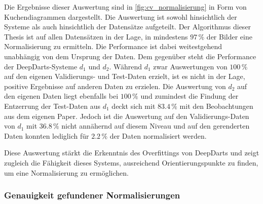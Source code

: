 Die Ergebnisse dieser Auswertung sind in \autoref{fig:cv_normalisierung} in Form von Kuchendiagrammen dargestellt. Die Auswertung ist sowohl hinsichtlich der Systeme als auch hinsichtlich der Datensätze aufgeteilt. Der Algorithmus dieser Thesis ist auf allen Datensätzen in der Lage, in mindestens $97\,\%$ der Bilder eine Normalisierung zu ermitteln. Die Performance ist dabei weitestgehend unabhängig von dem Ursprung der Daten. Dem gegenüber steht die Performance der DeepDarts-Systeme $d_1$ und $d_2$. Während $d_1$ zwar Auswertungen von $100\,\%$ auf den eigenen Validierungs- und Test-Daten erzielt, ist es nicht in der Lage, positive Ergebnisse auf anderen Daten zu erzielen. Die Auswertung von $d_2$ auf den eigenen Daten liegt ebenfalls bei $100\,\%$ und zumindest die Findung der Entzerrung der Test-Daten aus $d_1$ deckt sich mit $83.4\,\%$ mit den Beobachtungen aus dem eigenen Paper. Jedoch ist die Auswertung auf den Validierungs-Daten von $d_1$ mit $36.8\,\%$ nicht annähernd auf diesem Niveau und auf den gerenderten Daten konnten lediglich für $2.2\,\%$ der Daten normalisiert werden.

Diese Auswertung stärkt die Erkenntnis des Overfittings von DeepDarts und zeigt zugleich die Fähigkeit dieses Systems, ausreichend Orientierungspunkte zu finden, um eine Normalisierung zu ermöglichen.

\subsubsection{Genauigkeit gefundener Normalisierungen} %
\label{sec:genauigkeit_normalisierung}

\Similarities

